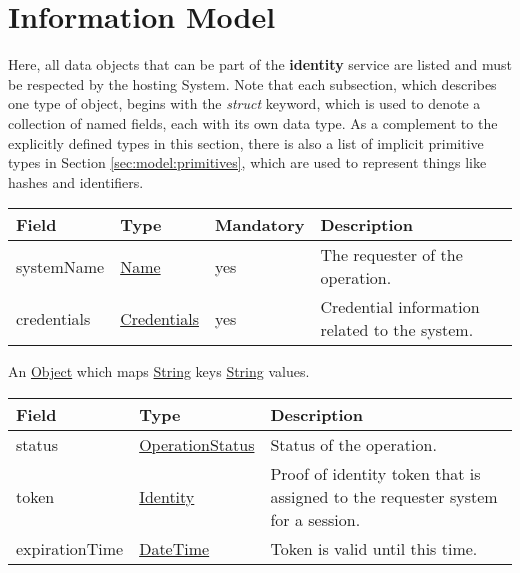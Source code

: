 \documentclass[a4paper]{arrowhead}
\newcommand{\pref}[1]{{\textcolor{ArrowheadGrey}{\hyperref[sec:model:primitives:#1]{#1}}}}
\begin{document}
\clearpage

\section{Information Model}
\label{sec:model}

Here, all data objects that can be part of the \textbf{identity} service are listed and must be respected by the hosting System.
Note that each subsection, which describes one type of object, begins with the \textit{struct} keyword, which is used to denote a collection of named fields, each with its own data type.
As a complement to the explicitly defined types in this section, there is also a list of implicit primitive types in Section \ref{sec:model:primitives}, which are used to represent things like hashes and identifiers.

{}
 
\begin{table}[ht!]
\begin{tabularx}{\textwidth}{| p{3cm} | p{3cm} | p{2cm} | X |} \hline
\rowcolor{gray!33} Field & Type & Mandatory & Description \\ \hline
systemName & \pref{Name} & yes & The requester of the operation. \\ \hline
credentials & \hyperref[sec:model:Credentials]{Credentials} & yes & Credential information related to the system. \\ \hline
\end{tabularx}
\end{table}


An \pref{Object} which maps \pref{String} keys  \pref{String} values.

 
\begin{table}[ht!]
\begin{tabularx}{\textwidth}{| p{4.25cm} | p{4cm} | X |} \hline
\rowcolor{gray!33} Field & Type      & Description \\ \hline
status & \pref{OperationStatus} & Status of the operation. \\ \hline
token & \hyperref[sec:model:Identity]{Identity} & Proof of identity token that is assigned to the requester system for a session. \\ \hline
expirationTime & \pref{DateTime} & Token is valid until this time. \\ \hline
\end{tabularx}
\end{table}
\end{document}
